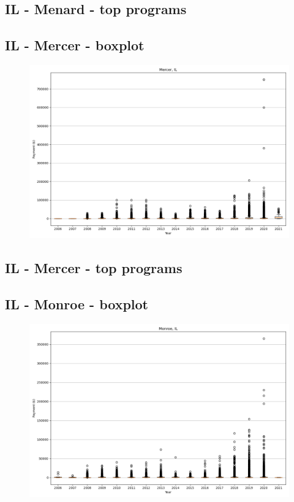 \subsection*{IL - Menard - top programs}

\newpage
\subsection*{IL - Mercer - boxplot}
\begin{figure}[h]
\centering
\includegraphics[width=7in]{../output/boxplots/counties/Mercer-IL_boxplot.png}
\end{figure}


\subsection*{IL - Mercer - top programs}

\newpage
\subsection*{IL - Monroe - boxplot}
\begin{figure}[h]
\centering
\includegraphics[width=7in]{../output/boxplots/counties/Monroe-IL_boxplot.png}
\end{figure}


